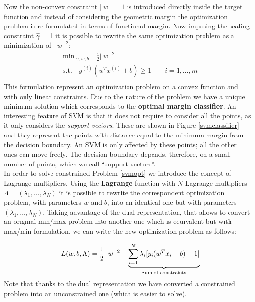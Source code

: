 Now the non-convex constraint $||w|| = 1$ is introduced directly inside the target function and instead of considering the geometric margin the optimization problem is re-formulated in terms of functional margin. Now imposing the scaling constraint $\hat{\gamma}$ = 1 it is possible to rewrite the same optimization problem as a minimization of $||w||^2$:
\begin{equation}\label{svmopt}
\begin{aligned}
&\text{min }_{\gamma,w,b} \quad \frac{1}{2}||w||^2\\
&\text{s.t.} \quad y^{(i)}(w^Tx^{(i)}+b) \geq 1 \qquad i = 1,\dots, m\\
\end{aligned}
\end{equation}
This formulation represent an optimization problem on a convex function and with only linear constraints. Due to the nature of the problem we have a unique minimum solution which corresponds to the \textbf{optimal margin classifier}. An interesting feature of SVM is that it does not require to consider all the points, as it only considers the \textit{support vectors}. These are shown in Figure \ref{svmclassifier} and they represent the points with distance equal to the minimum margin from the decision boundary. An SVM is only affected by these points; all the other ones can move freely. The decision boundary depends, therefore, on a small number of points, which we call ``support vectors''. \\

In order to solve constrained Problem \ref{svmopt} we introduce the concept of Lagrange multipliers. Using the \textbf{Lagrange} function with $N$ Lagrange multipliers $\Lambda = (\lambda_1,\dots,\lambda_N)$ it is possible to rewrite the correspondent optimization problem, with parameters $w$ and $b$, into an identical one but with parameters $(\lambda_1,\dots,\lambda_N)$. Taking advantage of the dual representation, that allows to convert an original min/max problem into another one which is equivalent but with max/min formulation, we can write the new optimization problem as follows:

\begin{equation}
\quad L(w,b,\Lambda) = \frac{1}{2}||w||^2 - \underbrace{\sum_{i = 1}^{N}\lambda_i[y_i(w^Tx_i+b)-1]}_{\text{Sum of constraints}}\\
\end{equation}
Note that thanks to the dual representation we have converted a constrained problem into an unconstrained one (which is easier to solve). \\

